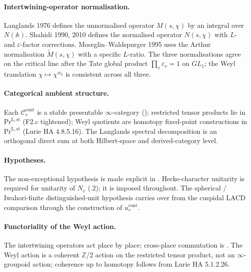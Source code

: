 \paragraph{Intertwining-operator normalisation.}
Langlands 1976 defines the unnormalised operator \(M(s,\chi)\) by
an integral over \(N(\mathbb{A})\). Shahidi 1990, 2010 defines the
normalised operator \(N(s,\chi)\) with \(L\)- and \(\varepsilon\)-factor
corrections. Mo{\oe}glin--Waldspurger 1995 uses the Arthur
normalisation \(\tilde M(s,\chi)\) with a specific \(L\)-ratio.
The three normalisations agree on the critical line after the
Tate global product \(\prod_v \varepsilon_v = 1\) on \(GL_1\); the
Weyl translation \(\chi\mapsto\chi^{w_0}\) is consistent across
all three.

\paragraph{Categorical ambient structure.}
Each \(\mathcal{C}^{\mathrm{cont}}_{v}\) is a stable presentable
\(\infty\)-category ();
restricted tensor products lie in \(\mathrm{Pr}^{\mathrm{L,st}}\)
(F2.c tightened); Weyl quotients are homotopy fixed-point
constructions in \(\mathrm{Pr}^{\mathrm{L,st}}\) (Lurie HA 4.8.5.16).
The Langlands spectral decomposition
 is an orthogonal direct
sum at both Hilbert-space and derived-category level.

\paragraph{Hypotheses.}
The non-exceptional hypothesis is made explicit in
. Hecke-character unitarity
is required for unitarity of \(N_v\)
(.2); it is imposed throughout.
The spherical / Iwahori-finite distinguished-unit hypothesis carries
over from the cuspidal LACD comparison through the construction of \(u^{\mathrm{cont}}_v\).

\paragraph{Functoriality of the Weyl action.}
The intertwining operators act place by place; cross-place
commutation is . The Weyl
action is a coherent \(\mathbb{Z}/2\) action on the restricted tensor
product, not an \(\infty\)-groupoid action; coherence up to homotopy
follows from Lurie HA 5.1.2.26.

